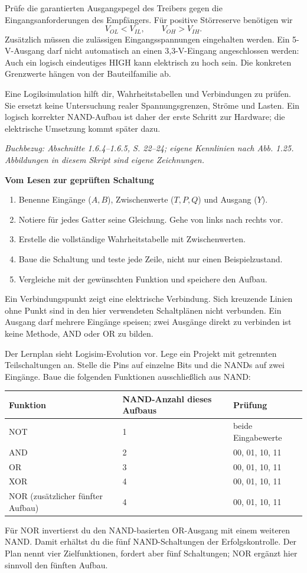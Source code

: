 \documentclass[10pt,a4paper]{article}
\newcommand{\titlepagepart}[2]{\vspace*{-4mm}{\sffamily\small #1}\par{\sffamily\LARGE\bfseries #2}\par\vspace{2mm}}
\newcommand{\block}[1]{\par\vspace{2mm}{\sffamily\large\bfseries #1}\par}
\newcommand{\source}[1]{\par{\footnotesize\itshape Buchbezug: #1. Abbildungen in diesem Skript sind eigene Zeichnungen.}}
\begin{document}
\block{Passen zwei Gatter elektrisch zusammen?}
Prüfe die garantierten Ausgangspegel des Treibers gegen die Eingangsanforderungen
des Empfängers. Für positive Störreserve benötigen wir
\[V_{OL}<V_{IL},\qquad V_{OH}>V_{IH}.\]
Zusätzlich müssen die zulässigen Eingangsspannungen eingehalten werden.
Ein 5-V-Ausgang darf nicht automatisch an einen 3,3-V-Eingang angeschlossen
werden: Auch ein logisch eindeutiges HIGH kann elektrisch zu hoch sein.
Die konkreten Grenzwerte hängen von der Bauteilfamilie ab.

\block{Was Logisim zeigt und was es vereinfacht}
Eine Logiksimulation hilft dir, Wahrheitstabellen und Verbindungen zu prüfen.
Sie ersetzt keine Untersuchung realer Spannungsgrenzen, Ströme und Lasten.
Ein logisch korrekter NAND-Aufbau ist daher der erste Schritt zur Hardware;
die elektrische Umsetzung kommt später dazu.
\source{Abschnitte 1.6.4--1.6.5, S. 22--24; eigene Kennlinien nach Abb. 1.25}

\newpage
\titlepagepart{08 / DEINE PRAXIS}{Vom Lesen zur geprüften Schaltung}
\block{So liest und prüfst du einen Aufbau}
\begin{enumerate}
\item Benenne Eingänge ($A,B$), Zwischenwerte ($T,P,Q$) und Ausgang ($Y$).
\item Notiere für jedes Gatter seine Gleichung. Gehe von links nach rechts vor.
\item Erstelle die vollständige Wahrheitstabelle mit Zwischenwerten.
\item Baue die Schaltung und teste jede Zeile, nicht nur einen Beispielzustand.
\item Vergleiche mit der gewünschten Funktion und speichere den Aufbau.
\end{enumerate}
Ein Verbindungspunkt zeigt eine elektrische Verbindung. Sich kreuzende Linien
ohne Punkt sind in den hier verwendeten Schaltplänen nicht verbunden.
Ein Ausgang darf mehrere Eingänge speisen; zwei Ausgänge direkt zu verbinden
ist keine Methode, AND oder OR zu bilden.

\block{Praktischer Arbeitsauftrag für Tag 5}
Der Lernplan sieht Logisim-Evolution vor. Lege ein Projekt mit getrennten
Teilschaltungen an. Stelle die Pins auf einzelne Bits und die NANDs auf zwei
Eingänge. Baue die folgenden Funktionen ausschließlich aus NAND:
\begin{center}
\begin{tabular}{lll}\toprule
Funktion&NAND-Anzahl dieses Aufbaus&Prüfung\\\midrule
NOT&1&beide Eingabewerte\\
AND&2&00, 01, 10, 11\\
OR&3&00, 01, 10, 11\\
XOR&4&00, 01, 10, 11\\
NOR (zusätzlicher fünfter Aufbau)&4&00, 01, 10, 11\\\bottomrule
\end{tabular}
\end{center}
Für NOR invertierst du den NAND-basierten OR-Ausgang mit einem weiteren NAND.
Damit erhältst du die fünf NAND-Schaltungen der Erfolgskontrolle.
Der Plan nennt vier Zielfunktionen, fordert aber fünf Schaltungen; NOR ergänzt
hier sinnvoll den fünften Aufbau.
\end{document}
